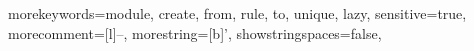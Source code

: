 {morekeywords={module, create, from, rule, to, unique, lazy},
sensitive=true,
morecomment=[l]{--},
morestring=[b]',
showstringspaces=false,
}